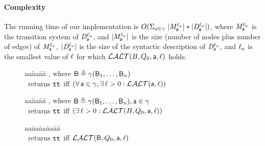 \paragraph{Complexity} The running  time of our implementation is
$O(\Sigma_{a \in \gamma}\  |\mathit{M}_{\mathsf{a}}^{\ell_a}| * |\mathit{D}_{\mathsf{a}}^{\ell_a}|)$, 
where 
$\mathit{M}_{\mathsf{a}}^{\ell_a}$ is the transition system of
$\mathit{D}_{\mathsf{a}}^{\ell_a}$, and $|\mathit{M}_{\mathsf{a}}^{\ell_a}|$ is the size (number of nodes plus number of edges) of 
$\mathit{M}_{\mathsf{a}}^{\ell_a}$, 
$|\mathit{D}_{\mathsf{a}}^{\ell_a}|$ is the size of the syntactic description of $\mathit{D}_{\mathsf{a}}^{\ell_a}$, and 
$\ell_a$ is the smallest value of $\ell$ for which $\mathcal{LALT}(B, Q_0, \mathsf{a}, \ell)$ holds.


\begin{figure}%
\setcounter{lctr}{0}
\begin{tabbing}\label{alg:check.LAO}
aa\= aa\= aa\= \kill
{},  where $\mathsf{B} \triangleq \gamma(\mathsf{B}_1,\dots,\mathsf{B}_n)$\\
\cmnt\ returns $\textup{\texttt{tt}}$ iff $(\forall\, \mathsf{a} \in \gamma, \exists\, \ell > 0: \mathcal{LALT}(\mathsf{a}, \ell))$\\
\lio{\ENDFOR;}
\end{tabbing}

\setcounter{lctr}{0}
\begin{tabbing}\label{alg:check.LAO.Int}
aa\= aa\= aa\= \kill
{},  where $\mathsf{B} \triangleq \gamma(\mathsf{B}_1,\dots,\mathsf{B}_n), \mathsf{a} \in \gamma$\\
\cmnt\ returns $\textup{\texttt{tt}}$ iff $(\exists\, \ell > 0: \mathcal{LALT}(B, Q_0, \mathsf{a}, \ell))$\\
\lio{\WHILEC{\ttt}}
\lion{\ENDWHILE}
\end{tabbing}

\setcounter{lctr}{0}
\begin{tabbing}
\label{alg:eval-ldfc}
aa\= aa\= aa\= aa\= aa\=\kill
{}\\
\cmnt\ returns $\textup{\texttt{tt}}$ iff $\mathcal{LALT}(\mathsf{B}, Q_0, \mathsf{a}, \ell)$\\
   \lit{\ENDFOR}
\lio{\ENDFOR;}
\end{tabbing}




\end{figure}
